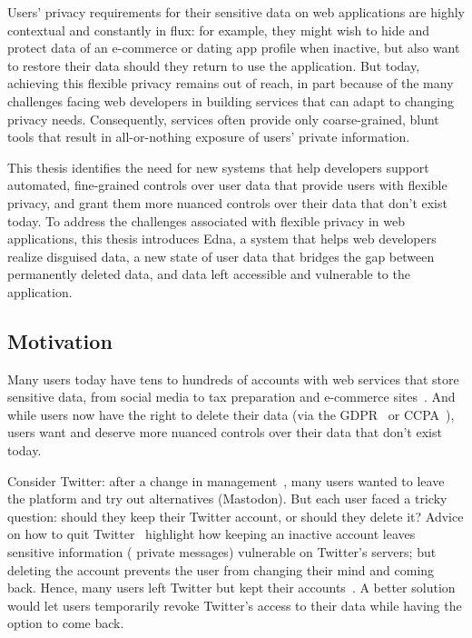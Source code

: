 Users' privacy requirements for their sensitive data on web applications are
highly contextual and constantly in flux: for example, they might wish to hide
and protect data of an e-commerce or dating app profile when inactive, but also
want to restore their data should they return to use the application. 
%
But today, achieving this flexible privacy remains out of reach, in part because
of the many challenges facing web developers
in building services that can adapt to changing privacy
needs. Consequently, services often provide only coarse-grained, blunt tools that
result in all-or-nothing exposure of users’ private information.
%

%
This thesis identifies the need for new systems that help developers support
automated, fine-grained controls over user data that provide users with flexible
privacy, and grant them more nuanced controls over their data that don't exist
today.
%
To address the challenges associated with flexible privacy in web applications,
this thesis introduces Edna, a system that helps web developers realize
disguised data, a new state of user data that bridges the gap between
permanently deleted data, and data left accessible and vulnerable to the
application.

\subsection{Motivation} 
Many users today have tens to hundreds of accounts with web
services that store sensitive data, from social media to tax preparation and
e-commerce sites~\cite{tens,hundreds,password_life_cycle}.
%
And while users now have the right to delete their data (via \eg the
GDPR~\cite{eu:gdpr} or CCPA~\cite{ccpa}), users want and deserve more nuanced
controls over their data that don't exist today.
%

Consider Twitter: after a change in management~\cite{musk-twitter}, many users
wanted to leave the platform and try out alternatives (\eg Mastodon).  But each
user faced a tricky question: should they keep their Twitter account, or should
they delete it?
%
Advice on how to quit Twitter~\cite{quit-twitter-india, quit-twitter-mash}
highlight how keeping an inactive account leaves sensitive information (\eg
private messages) vulnerable on Twitter's servers; but deleting the account
prevents the user from changing their mind and coming back.  Hence, many users
left Twitter but kept their accounts~\cite{nbc-twitter,shondarhimes,kenolin}.
%
A better solution would let users temporarily revoke Twitter's access to their
data while having the option to come back.

